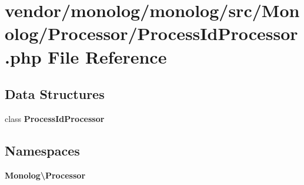 \section{vendor/monolog/monolog/src/\+Monolog/\+Processor/\+Process\+Id\+Processor.php File Reference}
\label{_process_id_processor_8php}
\subsection*{Data Structures}
\begin{DoxyCompactItemize}
\item 
class {\bf Process\+Id\+Processor}
\end{DoxyCompactItemize}
\subsection*{Namespaces}
\begin{DoxyCompactItemize}
\item 
 {\bf Monolog\textbackslash{}\+Processor}
\end{DoxyCompactItemize}
